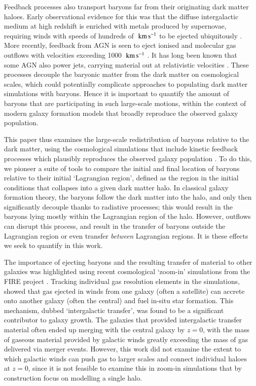 Feedback processes also transport baryons far from their originating dark
matter haloes. Early observational evidence for this was that the diffuse
intergalactic medium at high redshift is enriched with metals produced by
supernovae, requiring winds with speeds of hundreds of $\;{\rm km}\,{\rm s}^{-1}{}$ to be ejected
ubiquitously \citep[e.g.][]{Aguirre2001, Springel2003, Oppenheimer2006}. More
recently, feedback from AGN is seen to eject ionised and molecular gas
outflows with velocities exceeding 1000 $\;{\rm km}\,{\rm s}^{-1}{}$
\citep[e.g.][]{Sturm2001, Greene2012, Maiolino2012, Zakamska2016}. It has
long been known that some AGN also power jets, carrying material out at
relativistic velocities \citep{Fabian2012}. These processes decouple the
baryonic matter from the dark matter on cosmological scales, which could
potentially complicate approaches to populating dark matter simulations with
baryons. Hence it is important to quantify the amount of baryons that are
participating in such large-scale motions, within the context of modern
galaxy formation models that broadly reproduce the observed galaxy
population.

This paper thus examines the large-scale redistribution of baryons relative to the
dark matter, using the \simba{} cosmological simulations that include kinetic
feedback processes which plausibly reproduces the observed galaxy population
\citep{Dave2019}. To do this, we pioneer a suite of tools to compare the
initial and final location of baryons relative to their initial `Lagrangian
region', defined as the region in the initial conditions that collapses into
a given dark matter halo. In classical galaxy formation theory, the baryons
follow the dark matter into the halo, and only then significantly decouple
thanks to radiative processes; this would result in the baryons lying mostly
within the Lagrangian region of the halo. However, outflows can disrupt this
process, and result in the transfer of baryons outside the Lagrangian region
or even transfer \emph{between} Lagrangian regions. It is these effects we
seek to quantify in this work.

The importance of ejecting baryons and the resulting transfer of material to
other galaxies was highlighted using recent cosmological `zoom-in'
simulations from the FIRE project \citep{Hopkins2014,Hopkins2018}. Tracking
individual gas resolution elements in the simulations,
\citet{AnglesAlcazar2017} showed that gas ejected in winds from one galaxy
(often a satellite) can accrete onto another galaxy (often the central) and
fuel in-situ star formation. This mechanism, dubbed `intergalactic transfer',
was found to be a significant contributor to galaxy growth. The galaxies that
provided intergalactic transfer material often ended up merging with the
central galaxy by $z=0$, with the mass of gaseous material provided by
galactic winds greatly exceeding the mass of gas delivered via merger events.
However, this work did not examine the extent to which galactic winds can
push gas to larger scales and connect individual haloes at $z=0$, since it is
not feasible to examine this in zoom-in simulations that by construction
focus on modelling a single halo.

